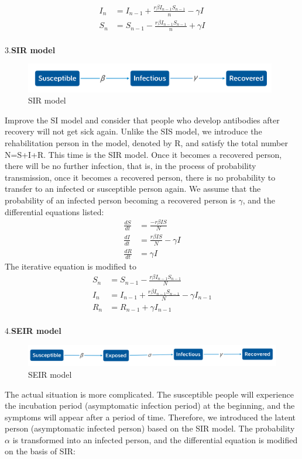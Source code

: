 \documentclass[a4paper, 11pt,twoside=true]{scrartcl}
\begin{document}
$$
\begin{aligned}
I_n&=I_{n-1}+\frac{r\beta I_{n-1}S_{n-1}}{n}-\gamma I  \\
S_n&=S_{n-1}-\frac{r\beta I_{n-1}S_{n-1}}{n}+\gamma I
\end{aligned}
$$\\
3.\textbf{SIR model}
\begin{figure}[H]
	\small
	\centering
	\includegraphics[width=11cm]{E3}
	\caption{SIR model} \label{C3}
\end{figure}
\quad Improve the SI model and consider that people who develop antibodies after recovery will not get sick again. Unlike the SIS model, we introduce the rehabilitation person in the model, denoted by R, and satisfy the total number N=S+I+R. This time is the SIR model. Once it becomes a recovered person, there will be no further infection, that is, in the process of probability transmission, once it becomes a recovered person, there is no probability to transfer to an infected or susceptible person again. We assume that the probability of an infected person becoming a recovered person is $\gamma $, and the differential equations listed:
$$
\begin{aligned}
\frac{dS}{dt}&=\frac{-r\beta IS}{N}  \\
\frac{dI}{dt}&=\frac{r\beta IS}{N}-\gamma I \\
\frac{dR}{dt}&=\gamma I
\end{aligned}
$$
\noindent The iterative equation is modified to
$$
\begin{aligned}
S_n&=S_{n-1}-\frac{r\beta I_{n-1}S_{n-1}}{N}  \\
I_n&=I_{n-1}+\frac{r\beta I_{n-1}S_{n-1}}{N}-\gamma I_{n-1}  \\
R_n&=R_{n-1}+\gamma I_{n-1}
\end{aligned}
$$\\
4.\textbf{SEIR model}
\begin{figure}[H]
	\small
	\centering
	\includegraphics[width=13cm]{E4}
	\caption{SEIR model} \label{C4}
\end{figure}
\quad The actual situation is more complicated. The susceptible people will experience the incubation period (asymptomatic infection period) at the beginning, and the symptoms will appear after a period of time. Therefore, we introduced the latent person (asymptomatic infected person) based on the SIR model. The probability $\alpha$ is transformed into an infected person, and the differential equation is modified on the basis of SIR:
\end{document}
